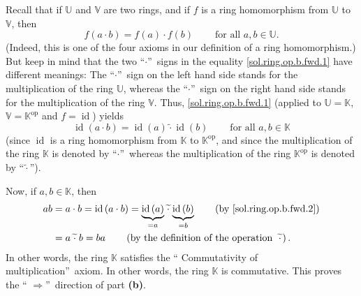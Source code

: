 \documentclass[paper=a4, fontsize=12pt]{scrartcl}%
\theoremstyle{plainsl}
\theoremstyle{definition}
\theoremstyle{remark}
\begin{document}
Recall that if $\mathbb{U}$ and $\mathbb{V}$ are two rings, and if $f$ is a
ring homomorphism from $\mathbb{U}$ to $\mathbb{V}$, then%
\begin{equation}
f\left(  a\cdot b\right)  =f\left(  a\right)  \cdot f\left(  b\right)
\ \ \ \ \ \ \ \ \ \ \text{for all }a,b\in\mathbb{U}.
\label{sol.ring.op.b.fwd.1}%
\end{equation}
(Indeed, this is one of the four axioms in our definition of a ring
homomorphism.) But keep in mind that the two \textquotedblleft$\cdot
$\textquotedblright\ signs in the equality \eqref{sol.ring.op.b.fwd.1} have
different meanings: The \textquotedblleft$\cdot$\textquotedblright\ sign on
the left hand side stands for the multiplication of the ring $\mathbb{U}$,
whereas the \textquotedblleft$\cdot$\textquotedblright\ sign on the right hand
side stands for the multiplication of the ring $\mathbb{V}$. Thus,
\eqref{sol.ring.op.b.fwd.1} (applied to $\mathbb{U}=\mathbb{K}$,
$\mathbb{V}=\mathbb{K}^{\operatorname*{op}}$ and $f=\operatorname*{id}$)
yields%
\begin{equation}
\operatorname*{id}\left(  a\cdot b\right)  =\operatorname*{id}\left(
a\right)  \left.  \widetilde{\cdot}\right.  \operatorname*{id}\left(
b\right)  \ \ \ \ \ \ \ \ \ \ \text{for all }a,b\in\mathbb{K}
\label{sol.ring.op.b.fwd.2}%
\end{equation}
(since $\operatorname*{id}$ is a ring homomorphism from $\mathbb{K}$ to
$\mathbb{K}^{\operatorname{op}}$, and since the multiplication of the ring
$\mathbb{K}$ is denoted by \textquotedblleft$\cdot$\textquotedblright\ whereas
the multiplication of the ring $\mathbb{K}^{\operatorname*{op}}$ is denoted by
\textquotedblleft$\left.  \widetilde{\cdot}\right.  $\textquotedblright).

Now, if $a,b\in\mathbb{K}$, then%
\begin{align*}
ab  &  =a\cdot b=\operatorname*{id}\left(  a\cdot b\right)
=\underbrace{\operatorname*{id}\left(  a\right)  }_{=a}\left.
\widetilde{\cdot}\right.  \underbrace{\operatorname*{id}\left(  b\right)
}_{=b}\qquad\left(  \text{by \eqref{sol.ring.op.b.fwd.2}}\right) \\
&  =a\left.  \widetilde{\cdot}\right.  b=ba\qquad\left(  \text{by the
definition of the operation }\left.  \widetilde{\cdot}\right.  \right)  .
\end{align*}
In other words, the ring $\mathbb{K}$ satisfies the \textquotedblleft
Commutativity of multiplication\textquotedblright\ axiom. In other words, the
ring $\mathbb{K}$ is commutative. This proves the \textquotedblleft%
$\Longrightarrow$\textquotedblright\ direction of part \textbf{(b)}.
\end{document}

